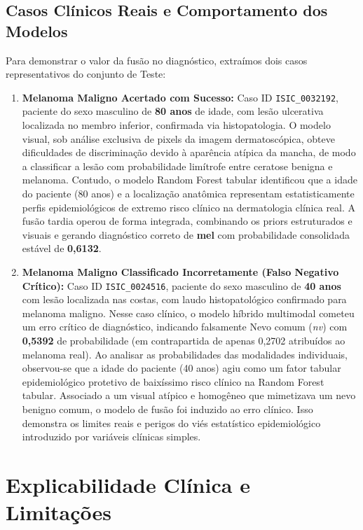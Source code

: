 \documentclass[10pt,twocolumn,letterpaper]{article}
\begin{document}
\subsection{Casos Clínicos Reais e Comportamento dos Modelos}
Para demonstrar o valor da fusão no diagnóstico, extraímos dois casos representativos do conjunto de Teste:
\begin{enumerate}
    \item \textbf{Melanoma Maligno Acertado com Sucesso:} Caso ID \texttt{ISIC\_0032192}, paciente do sexo masculino de \textbf{80 anos} de idade, com lesão ulcerativa localizada no membro inferior, confirmada via histopatologia. O modelo visual, sob análise exclusiva de pixels da imagem dermatoscópica, obteve dificuldades de discriminação devido à aparência atípica da mancha, de modo a classificar a lesão com probabilidade limítrofe entre ceratose benigna e melanoma. Contudo, o modelo Random Forest tabular identificou que a idade do paciente (80 anos) e a localização anatômica representam estatisticamente perfis epidemiológicos de extremo risco clínico na dermatologia clínica real. A fusão tardia operou de forma integrada, combinando os priors estruturados e visuais e gerando diagnóstico correto de \textbf{mel} com probabilidade consolidada estável de \textbf{0,6132}.
    \item \textbf{Melanoma Maligno Classificado Incorretamente (Falso Negativo Crítico):} Caso ID \texttt{ISIC\_0024516}, paciente do sexo masculino de \textbf{40 anos} com lesão localizada nas costas, com laudo histopatológico confirmado para melanoma maligno. Nesse caso clínico, o modelo híbrido multimodal cometeu um erro crítico de diagnóstico, indicando falsamente Nevo comum (\emph{nv}) com \textbf{0,5392} de probabilidade (em contrapartida de apenas 0,2702 atribuídos ao melanoma real). Ao analisar as probabilidades das modalidades individuais, observou-se que a idade do paciente (40 anos) agiu como um fator tabular epidemiológico protetivo de baixíssimo risco clínico na Random Forest tabular. Associado a um visual atípico e homogêneo que mimetizava um nevo benigno comum, o modelo de fusão foi induzido ao erro clínico. Isso demonstra os limites reais e perigos do viés estatístico epidemiológico introduzido por variáveis clínicas simples.
\end{enumerate}

\section{Explicabilidade Clínica e Limitações}
\label{sec:discussao}
\end{document}
